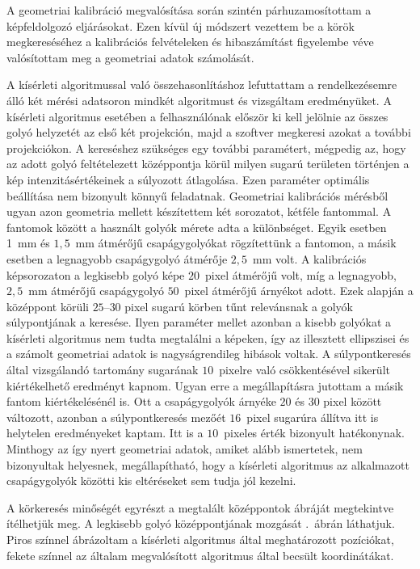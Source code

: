 \documentclass[a4paper,12pt]{article}
\begin{document}
A geometriai kalibráció megvalósítása során szintén párhuzamosítottam a képfeldolgozó eljárásokat. Ezen kívül új módszert vezettem be a körök megkereséséhez a kalibrációs felvételeken és hibaszámítást figyelembe véve valósítottam meg a geometriai adatok számolását.

A kísérleti algoritmussal való összehasonlításhoz lefuttattam a rendelkezésemre álló két mérési adatsoron mindkét algoritmust és vizsgáltam eredményüket. A kísérleti algoritmus esetében a felhasználónak először ki kell jelölnie az összes golyó helyzetét az első két projekción, majd a szoftver megkeresi azokat a további projekciókon. A kereséshez szükséges egy további paramétert, mégpedig az, hogy az adott golyó feltételezett középpontja körül milyen sugarú területen történjen a kép intenzitásértékeinek a súlyozott átlagolása. Ezen paraméter optimális beállítása nem bizonyult könnyű feladatnak. Geometriai kalibrációs mérésből ugyan azon geometria mellett készítettem két sorozatot, kétféle fantommal. A fantomok között a használt golyók mérete adta a különbséget. Egyik esetben 1~mm és $1,\!5$~mm átmérőjű csapágygolyókat rögzítettünk a fantomon, a másik esetben a legnagyobb csapágygolyó átmérője $2,\!5$~mm volt. A kalibrációs képsorozaton a legkisebb golyó képe $20$~pixel átmérőjű volt, míg a legnagyobb, $2,\!5$~mm átmérőjű csapágygolyó $50$~pixel átmérőjű árnyékot adott. Ezek alapján a középpont körüli $25$--$30$ pixel sugarú körben tűnt relevánsnak a golyók súlypontjának a keresése. Ilyen paraméter mellet azonban a kisebb golyókat a kísérleti algoritmus nem tudta megtalálni a képeken, így az illesztett ellipszisei és a számolt geometriai adatok is nagyságrendileg hibások voltak. A súlypontkeresés által vizsgálandó tartomány sugarának $10$~pixelre való csökkentésével sikerült kiértékelhető eredményt kapnom. Ugyan erre a megállapításra jutottam a másik fantom kiértékelésénél is. Ott a csapágygolyók árnyéke $20$ és $30$ pixel között változott, azonban a súlypontkeresés mezőét $16$~pixel sugarúra állítva itt is helytelen eredményeket kaptam. Itt is a $10$~pixeles érték bizonyult hatékonynak. Minthogy az így nyert geometriai adatok, amiket alább ismertetek, nem bizonyultak helyesnek, megállapítható, hogy a kísérleti algoritmus az alkalmazott csapágygolyók közötti kis eltéréseket sem tudja jól kezelni.

A körkeresés minőségét egyrészt a megtalált középpontok ábráját megtekintve ítélhetjük meg. A legkisebb golyó  középpontjának mozgását .~ábrán láthatjuk. Piros színnel ábrázoltam a kísérleti algoritmus által meghatározott pozíciókat, fekete színnel az általam megvalósított algoritmus által becsült koordinátákat.
\end{document}
